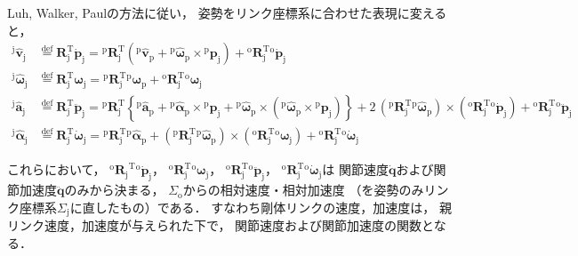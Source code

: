 ﻿\documentclass[a4paper]{jsarticle}
\begin{document}
Luh, Walker, Paulの方法に従い，
姿勢をリンク座標系に合わせた表現に変えると，
\begin{align*}
{}^{\mathrm{j}}\hat{\bm{v}}_{\mathrm{j}}
&\overset{\mathrm{def}}{=}\bm{R}_{\mathrm{j}}^{\mathrm{T}}\dot{\bm{p}}_{\mathrm{j}}
={}^{\mathrm{p}}\bm{R}_{\mathrm{j}}^{\mathrm{T}}\left(
{}^{\mathrm{p}}\hat{\bm{v}}_{\mathrm{p}}
 +{}^{\mathrm{p}}\hat{\bm{\omega}}_{\mathrm{p}}\times{}^{\mathrm{p}}\bm{p}_{\mathrm{j}}
\right)
 +{}^{\mathrm{o}}\bm{R}_{\mathrm{j}}^{\mathrm{T}}{}^{\mathrm{o}}\dot{\bm{p}}_{\mathrm{j}} \\
{}^{\mathrm{j}}\hat{\bm{\omega}}_{\mathrm{j}}
&\overset{\mathrm{def}}{=}\bm{R}_{\mathrm{j}}^{\mathrm{T}}\bm{\omega}_{\mathrm{j}}
={}^{\mathrm{p}}\bm{R}_{\mathrm{j}}^{\mathrm{T}}{}^{\mathrm{p}}\bm{\omega}_{\mathrm{p}}
 +{}^{\mathrm{o}}\bm{R}_{\mathrm{j}}^{\mathrm{T}}{}^{\mathrm{o}}\bm{\omega}_{\mathrm{j}} \\
{}^{\mathrm{j}}\hat{\bm{a}}_{\mathrm{j}}
&\overset{\mathrm{def}}{=}\bm{R}_{\mathrm{j}}^{\mathrm{T}}\ddot{\bm{p}}_{\mathrm{j}}
={}^{\mathrm{p}}\bm{R}_{\mathrm{j}}^{\mathrm{T}}\left\{
 {}^{\mathrm{p}}\hat{\bm{a}}_{\mathrm{p}}
 +{}^{\mathrm{p}}\hat{\bm{\alpha}}_{\mathrm{p}}\times{}^{\mathrm{p}}\bm{p}_{\mathrm{j}}
 +{}^{\mathrm{p}}\hat{\bm{\omega}}_{\mathrm{p}}\times({}^{\mathrm{p}}\hat{\bm{\omega}}_{\mathrm{p}}\times{}^{\mathrm{p}}\bm{p}_{\mathrm{j}})
\right\}
 +2\,({}^{\mathrm{p}}\bm{R}_{\mathrm{j}}^{\mathrm{T}}{}^{\mathrm{p}}\hat{\bm{\omega}}_{\mathrm{p}})\times
   ({}^{\mathrm{o}}\bm{R}_{\mathrm{j}}^{\mathrm{T}}{}^{\mathrm{o}}\dot{\bm{p}}_{\mathrm{j}})
 +{}^{\mathrm{o}}\bm{R}_{\mathrm{j}}^{\mathrm{T}}{}^{\mathrm{o}}\ddot{\bm{p}}_{\mathrm{j}}
 \\
{}^{\mathrm{j}}\hat{\bm{\alpha}}_{\mathrm{j}}
&\overset{\mathrm{def}}{=}\bm{R}_{\mathrm{j}}^{\mathrm{T}}\dot{\bm{\omega}}_{\mathrm{j}}
={}^{\mathrm{p}}\bm{R}_{\mathrm{j}}^{\mathrm{T}}{}^{\mathrm{p}}\hat{\bm{\alpha}}_{\mathrm{p}}
 +({}^{\mathrm{p}}\bm{R}_{\mathrm{j}}^{\mathrm{T}}{}^{\mathrm{p}}\hat{\bm{\omega}}_{\mathrm{p}})\times
   ({}^{\mathrm{o}}\bm{R}_{\mathrm{j}}^{\mathrm{T}}{}^{\mathrm{o}}\bm{\omega}_{\mathrm{j}})
 +{}^{\mathrm{o}}\bm{R}_{\mathrm{j}}^{\mathrm{T}}{}^{\mathrm{o}}\dot{\bm{\omega}}_{\mathrm{j}}
\end{align*}

これらにおいて，
${{}^{\mathrm{o}}\bm{R}_{\mathrm{j}}}^{\mathrm{T}}{}^{\mathrm{o}}\dot{\bm{p}}_{\mathrm{j}}$，
${}^{\mathrm{o}}\bm{R}_{\mathrm{j}}^{\mathrm{T}}{}^{\mathrm{o}}\bm{\omega}_{\mathrm{j}}$，
${}^{\mathrm{o}}\bm{R}_{\mathrm{j}}^{\mathrm{T}}{}^{\mathrm{o}}\ddot{\bm{p}}_{\mathrm{j}}$，
${}^{\mathrm{o}}\bm{R}_{\mathrm{j}}^{\mathrm{T}}{}^{\mathrm{o}}\dot{\bm{\omega}}_{\mathrm{j}}$は
関節速度$\dot{\bm{q}}$および関節加速度$\ddot{\bm{q}}$のみから決まる，
$\Sigma_{\mathrm{o}}$からの相対速度・相対加速度
（を姿勢のみリンク座標系$\Sigma_{\mathrm{j}}$に直したもの）である．
すなわち剛体リンクの速度，加速度は，
親リンク速度，加速度が与えられた下で，
関節速度および関節加速度の関数となる．
\end{document}
